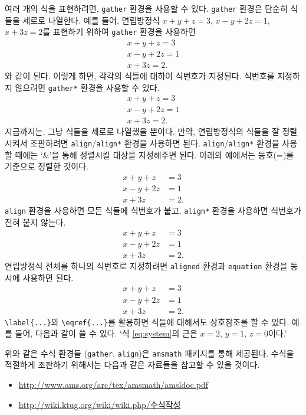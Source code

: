 \documentclass{report}
\begin{document}
여러 개의 식을 표현하려면, \texttt{gather} 환경을 사용할 수 있다.
\texttt{gather} 환경은 단순히 식들을 세로로 나열한다.
예를 들어, 연립방정식 \(x+y+z=3\), \(x-y+2z=1\), \(x+3z=2\)를 표현하기 위하여 \texttt{gather} 환경을 사용하면
\begin{gather}
x+y+z=3\\
x-y+2z=1\\
x+3z=2.
\end{gather}
와 같이 된다.
이렇게 하면, 각각의 식들에 대하여 식번호가 지정된다.
식번호를 지정하지 않으려면 \texttt{gather*} 환경을 사용할 수 있다.
\begin{gather*}
x+y+z=3\\
x-y+2z=1\\
x+3z=2.
\end{gather*}
지금까지는, 그냥 식들을 세로로 나열했을 뿐이다.
만약, 연립방정식의 식들을 잘 정렬시켜서 조판하려면 \texttt{align}/\texttt{align*} 환경을 사용하면 된다.
\texttt{align}/\texttt{align*} 환경을 사용할 때에는 `\&'을 통해 정렬시킬 대상을 지정해주면 된다.
아래의 예에서는 등호(=)를 기준으로 정렬한 것이다.
\begin{align*}
x+y+z&=3\\
x-y+2z&=1\\
x+3z&=2.
\end{align*}
\texttt{align} 환경을 사용하면 모든 식들에 식번호가 붙고, \texttt{align*} 환경을 사용하면 식번호가 전혀 붙지 않는다.
\begin{align}
x+y+z&=3\\
x-y+2z&=1\\
x+3z&=2.
\end{align}
연립방정식 전체를 하나의 식번호로 지정하려면 \texttt{aligned} 환경과 \texttt{equation} 환경을 동시에 사용하면 된다.
\begin{equation}\label{eq:system}
\begin{aligned}
x+y+z&=3\\
x-y+2z&=1\\
x+3z&=2.
\end{aligned}
\end{equation}
\verb|\label{...}|와 \verb|\eqref{...}|를 활용하면 식들에 대해서도 상호참조를 할 수 있다.
예를 들어, 다음과 같이 쓸 수 있다.
`식 \eqref{eq:system}의 근은 \(x=2\), \(y=1\), \(z=0\)이다.'

위와 같은 수식 환경들 (\texttt{gather}, \texttt{align})은 \texttt{amsmath} 패키지를 통해 제공된다.
수식을 적절하게 조판하기 위해서는 다음과 같은 자료들을 참고할 수 있을 것이다.
\begin{itemize}
\item
\url{http://www.ams.org/arc/tex/amsmath/amsldoc.pdf}
\item
\url{http://wiki.ktug.org/wiki/wiki.php/수식작성}
\end{itemize}
\end{document}
